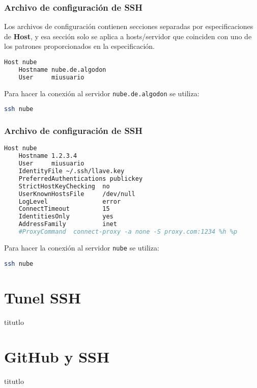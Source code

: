 \begin{frame}[fragile]
  \frametitle{Archivo de configuración de SSH}

  Los archivos de configuración contienen secciones separadas por
  especificaciones de \textbf{Host}, y esa sección solo se aplica
  a hosts/servidor que coinciden con uno de los patrones
  proporcionados en la especificación.

  \vspace{\baselineskip}
  \begin{lstlisting}[language=Bash,basicstyle={\footnotesize\ttfamily}]
Host nube
    Hostname nube.de.algodon
    User     miusuario
  \end{lstlisting}

  \pause
  \vspace{\baselineskip}
  Para hacer la conexión al servidor \texttt{nube.de.algodon} se utiliza:
  \begin{lstlisting}[language=Bash]
ssh nube
  \end{lstlisting}
\end{frame}

\begin{frame}[fragile]
  \frametitle{Archivo de configuración de SSH}

  \begin{lstlisting}[language=Bash,basicstyle={\footnotesize\ttfamily}]
Host nube
    Hostname 1.2.3.4
    User     miusuario
    IdentityFile ~/.ssh/llave.key
    PreferredAuthentications publickey
    StrictHostKeyChecking  no
    UserKnownHostsFile     /dev/null
    LogLevel               error
    ConnectTimeout         15
    IdentitiesOnly         yes
    AddressFamily          inet
    #ProxyCommand  connect-proxy -a none -S proxy.com:1234 %h %p
  \end{lstlisting}

  \vspace{\baselineskip}
  Para hacer la conexión al servidor \texttt{nube} se utiliza:
  \begin{lstlisting}[language=Bash]
ssh nube
  \end{lstlisting}
\end{frame}



\section{Tunel SSH}

\begin{frame}[c]{titutlo}
\end{frame}

\section{GitHub y SSH}

\begin{frame}[c]{titutlo}
\end{frame}

